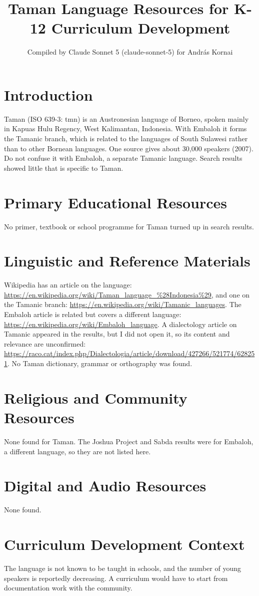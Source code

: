 \documentclass[12pt]{article}
\title{Taman Language Resources for K-12 Curriculum Development}
\author{Compiled by Claude Sonnet 5 (claude-sonnet-5) for Andr\'as Kornai}
\date{}
\begin{document}
\maketitle

\section{Introduction}
Taman (ISO 639-3: tmn) is an Austronesian language of Borneo, spoken mainly in Kapuas Hulu Regency, West Kalimantan, Indonesia. With Embaloh it forms the Tamanic branch, which is related to the languages of South Sulawesi rather than to other Bornean languages. One source gives about 30,000 speakers (2007). Do not confuse it with Embaloh, a separate Tamanic language. Search results showed little that is specific to Taman.

\section{Primary Educational Resources}
No primer, textbook or school programme for Taman turned up in search results.

\section{Linguistic and Reference Materials}
Wikipedia has an article on the language: \url{https://en.wikipedia.org/wiki/Taman_language_%28Indonesia%29}, and one on the Tamanic branch: \url{https://en.wikipedia.org/wiki/Tamanic_languages}. The Embaloh article is related but covers a different language: \url{https://en.wikipedia.org/wiki/Embaloh_language}. A dialectology article on Tamanic appeared in the results, but I did not open it, so its content and relevance are unconfirmed: \url{https://raco.cat/index.php/Dialectologia/article/download/427266/521774/628251}. No Taman dictionary, grammar or orthography was found.

\section{Religious and Community Resources}
None found for Taman. The Joshua Project and Sabda results were for Embaloh, a different language, so they are not listed here.

\section{Digital and Audio Resources}
None found.

\section{Curriculum Development Context}
The language is not known to be taught in schools, and the number of young speakers is reportedly decreasing. A curriculum would have to start from documentation work with the community.
\end{document}
